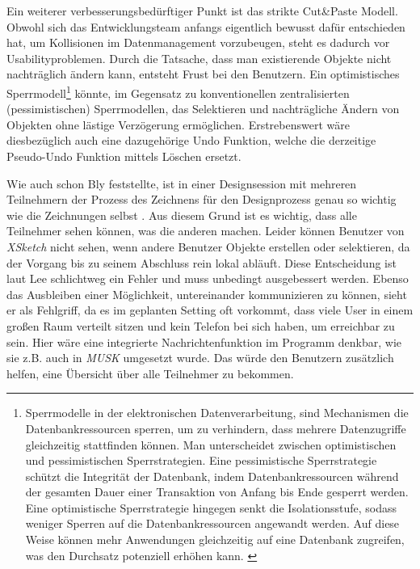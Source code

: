 Ein weiterer verbesserungsbedürftiger Punkt ist das strikte Cut\&Paste Modell. Obwohl sich das Entwicklungsteam anfangs eigentlich bewusst dafür entschieden hat, um Kollisionen im Datenmanagement vorzubeugen, steht es dadurch vor Usabilityproblemen. Durch die Tatsache, dass man existierende Objekte nicht nachträglich ändern kann, entsteht Frust bei den Benutzern. Ein optimistisches Sperrmodell\footnote{Sperrmodelle in der elektronischen Datenverarbeitung, sind Mechanismen die Datenbankressourcen sperren, um zu verhindern, dass mehrere Datenzugriffe gleichzeitig stattfinden können. Man unterscheidet zwischen optimistischen und pessimistischen Sperrstrategien. Eine pessimistische Sperrstrategie schützt die Integrität der Datenbank, indem Datenbankressourcen während der gesamten Dauer einer Transaktion von Anfang bis Ende gesperrt werden. Eine optimistische Sperrstrategie hingegen senkt die Isolationsstufe, sodass weniger Sperren auf die Datenbankressourcen angewandt werden. Auf diese Weise können mehr Anwendungen gleichzeitig auf eine Datenbank zugreifen, was den Durchsatz potenziell erhöhen kann. \citep{IBM:1996:Online}} könnte, im Gegensatz zu konventionellen zentralisierten (pessimistischen) Sperrmodellen, das Selektieren und nachträgliche Ändern von Objekten ohne lästige Verzögerung ermöglichen. Erstrebenswert wäre diesbezüglich auch eine dazugehörige Undo Funktion, welche die derzeitige Pseudo-Undo Funktion mittels Löschen ersetzt.

Wie auch schon Bly feststellte, ist in einer Designsession mit mehreren Teilnehmern der Prozess des Zeichnens für den Designprozess genau so wichtig wie die Zeichnungen selbst \citep{Bly:1988:UDS:62266.62286}. Aus diesem Grund ist es wichtig, dass alle Teilnehmer sehen können, was die anderen machen. Leider können Benutzer von \emph{XSketch} nicht sehen, wenn andere Benutzer Objekte erstellen oder selektieren, da der Vorgang bis zu seinem Abschluss rein lokal abläuft. Diese Entscheidung ist laut Lee schlichtweg ein Fehler und muss unbedingt ausgebessert werden. Ebenso das Ausbleiben einer Möglichkeit, untereinander kommunizieren zu können, sieht er als Fehlgriff, da es im geplanten Setting oft vorkommt, dass viele User in einem großen Raum verteilt sitzen und kein Telefon bei sich haben, um erreichbar zu sein. Hier wäre eine integrierte Nachrichtenfunktion im Programm denkbar, wie sie z.B. auch in \emph{MUSK} \citep{Crampton:1987} umgesetzt wurde. Das würde den Benutzern zusätzlich helfen, eine Übersicht über alle Teilnehmer zu bekommen. 

